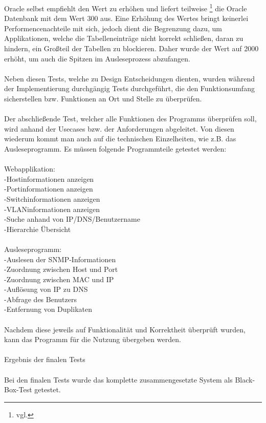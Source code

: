 Oracle selbst empfiehlt den Wert zu erhöhen und liefert teilweise \footnote{vgl.} die Oracle Datenbank mit dem Wert 300 aus. Eine Erhöhung des Wertes bringt keinerlei Performencenachteile mit sich, jedoch dient die Begrenzung dazu, um Applikationen, welche die Tabelleneinträge nicht korrekt schließen, daran zu hindern, ein Großteil der Tabellen zu blockieren. Daher wurde der Wert auf 2000 erhöht, um auch die Spitzen im Ausleseprozess abzufangen.\\\\
Neben diesen Tests, welche zu Design Entscheidungen dienten, wurden während der Implementierung durchgängig Tests durchgeführt, die den Funktionsumfang sicherstellen bzw. Funktionen an Ort und Stelle zu überprüfen.\\\\
Der abschließende Test, welcher alle Funktionen des Programms überprüfen soll, wird anhand der Usecases bzw. der Anforderungen abgeleitet. Von diesen wiederum kommt man auch auf die technischen Einzelheiten, wie z.B. das Ausleseprogramm.
Es müssen folgende Programmteile getestet werden:\\
\\
Webapplikation:\\
-Hostinformationen anzeigen\\
-Portinformationen anzeigen\\
-Switchinformationen anzeigen\\
-VLANinformationen anzeigen\\
-Suche anhand von IP/DNS/Benutzername\\
-Hierarchie Übersicht\\
\\
Ausleseprogramm:\\
-Auslesen der SNMP-Informationen\\
-Zuordnung zwischen Host und Port \\
-Zuordnung zwischen MAC und IP\\
-Auflösung von IP zu DNS\\
-Abfrage des Benutzers\\
-Entfernung von Duplikaten\\
\\
Nachdem diese jeweils auf Funktionalität und Korrektheit überprüft wurden, kann das Programm für die Nutzung übergeben werden.\\
\\
Ergebnis der finalen Tests\\
\\
Bei den finalen Tests wurde das komplette zusammengesetzte System als Black-Box-Test getestet.

